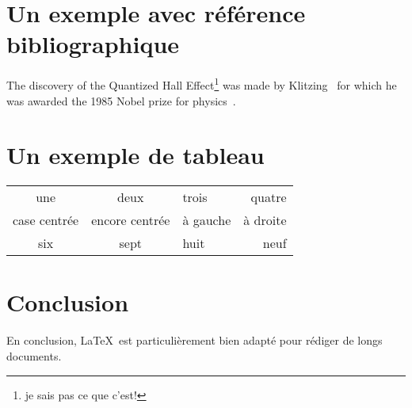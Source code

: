 \documentclass[a4paper,11pt]{article}
\begin{document}
\section{Un exemple avec référence bibliographique}
The discovery of the Quantized Hall Effect\footnote{je sais pas ce que c'est!} was made by
Klitzing~\cite{qhe} for which he was awarded the 1985 Nobel
prize for physics~\cite{nobel}.

\section{Un exemple de tableau}
\begin{tabular}{|*{2}{c|}l r|}
\hline
une & deux & trois & quatre \\
case centrée & encore centrée & à gauche & à droite \\
\hline
six & sept & huit & neuf \\
\hline
\end{tabular}
\section{Conclusion}               %
En conclusion, \LaTeX\ est
particulièrement bien adapté pour
rédiger de longs documents.


\end{document}

